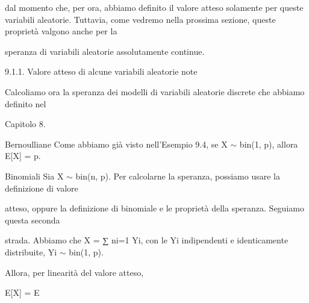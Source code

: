 \documentclass[a4paper,portrait,12pt]{article}
\begin{document}
\begin{flushleft}
dal momento che, per ora, abbiamo definito il valore atteso solamente per queste variabili aleatorie. Tuttavia, come vedremo nella prossima sezione, queste propriet\`{a} valgono anche per la
\end{flushleft}


\begin{flushleft}
speranza di variabili aleatorie assolutamente continue.
\end{flushleft}





\begin{flushleft}
9.1.1. Valore atteso di alcune variabili aleatorie note
\end{flushleft}


\begin{flushleft}
Calcoliamo ora la speranza dei modelli di variabili aleatorie discrete che abbiamo definito nel
\end{flushleft}


\begin{flushleft}
Capitolo 8.
\end{flushleft}


\begin{flushleft}
Bernoulliane Come abbiamo gi\`{a} visto nell'Esempio 9.4, se X $\sim$ bin(1, p), allora E[X] = p.
\end{flushleft}


\begin{flushleft}
Binomiali Sia X $\sim$ bin(n, p). Per calcolarne la speranza, possiamo usare la definizione di valore
\end{flushleft}


\begin{flushleft}
atteso, oppure la definizione di binomiale e le propriet\`{a} della speranza. Seguiamo questa seconda
\end{flushleft}


\begin{flushleft}
strada. Abbiamo che X = ∑ ni=1 Yi, con le Yi indipendenti e identicamente distribuite, Yi $\sim$ bin(1, p).
\end{flushleft}


\begin{flushleft}
Allora, per linearit\`{a} del valore atteso,
\end{flushleft}


\begin{flushleft}
E[X] = E
\end{flushleft}
\end{document}
